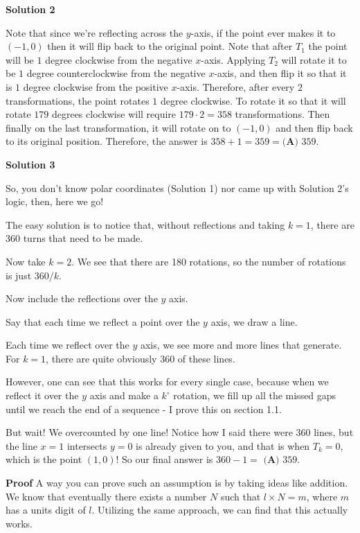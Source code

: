 \begin{enumerate}
\textbf{Solution 2}

Note that since we're reflecting across the $y$-axis, if the point ever makes it to $(-1,0)$ then it will flip back to the original point. Note that after $T_1$ the point will be $1$ degree clockwise from the negative $x$-axis. Applying $T_2$ will rotate it to be $1$ degree counterclockwise from the negative $x$-axis, and then flip it so that it is $1$ degree clockwise from the positive $x$-axis. Therefore, after every $2$ transformations, the point rotates $1$ degree clockwise. To rotate it so that it will rotate $179$ degrees clockwise will require $179 \cdot 2 = 358$ transformations. Then finally on the last transformation, it will rotate on to $(-1,0)$ and then flip back to its original position. Therefore, the answer is $358+1 = 359 = \boxed{\textbf{(A) } 359}$.

 



\textbf{Solution 3}

So, you don't know polar coordinates (Solution 1) nor came up with Solution 2's logic, then, here we go!

 The easy solution is to notice that, without reflections and taking \( k=1 \), there are 360 turns that need to be made.

 Now take \( k=2 \). We see that there are 180 rotations, so the number of rotations is just \( 360/k \).

 Now include the reflections over the \( y \) axis.

 Say that each time we reflect a point over the \( y \) axis, we draw a line.

 Each time we reflect over the \( y\) axis, we see more and more lines that generate. For \( k=1 \), there are quite obviously 360 of these lines.

 However, one can see that this works for every single case, because when we reflect it over the \( y\) axis and make a \( k^\circ \) rotation, we fill up all the missed gaps until we reach the end of a sequence - I prove this on section 1.1.

 But wait! We overcounted by one line! Notice how I said there were 360 lines, but the line \(x=1\) intersects \( y=0\) is already given to you, and that is when \(T_k = 0\), which is the point \( (1, 0) \)! So our final answer is \( 360-1 = \) $\boxed{\textbf{(A) } 359}.$

 \textbf{Proof} A way you can prove such an assumption is by taking ideas like addition. We know that eventually there exists a number \( N \) such that \( l \times N = m \), where \( m \) has a units digit of \( l \). Utilizing the same approach, we can find that this actually works.


\end{enumerate}
